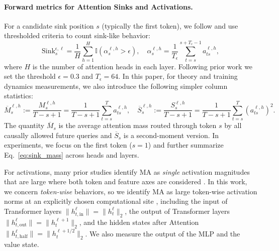 \documentclass{article}
\theoremstyle{plain}
\theoremstyle{definition}
\theoremstyle{remark}
\begin{document}
\paragraph{Forward metrics for Attention Sinks and Activations.}
For a candidate sink position $s$ (typically the first token), we follow \citep{gu2025when,queipo-de-llano2026attention} and use thresholded criteria to count sink-like behavior:
\begin{equation}\label{eq:sink_rate}
    \text{Sink}_s^{\epsilon,\ell} = \frac{1}{H} \sum_{h=1}^H \mathbb{I}(\alpha_s^{\ell,h} > \epsilon),
    \quad
    \alpha_s^{\ell,h}=\frac{1}{T_\epsilon}\sum_{t=s}^{s+T_\epsilon-1} a_{ts}^{\ell,h},
\end{equation}
where $H$ is the number of attention heads in each layer. Following prior work \citep{gu2025when} we set the threshold $\epsilon=0.3$ and $T_\epsilon=64$. In this paper, for theory and training dynamics measurements, we also introduce the following simpler column statistics:
\begin{equation}\label{eq:sink_mass}
\overline M_s^{\ell,h} := \frac{M_s^{\ell,h}}{T-s+1} = \frac{1}{T-s+1} \sum_{t=s}^{T} a_{ts}^{\ell,h},
\quad
\overline S_s^{\ell,h} := \frac{S_s^{\ell,h}}{T-s+1} = \frac{1}{T-s+1}\sum_{t=s}^{T} (a_{ts}^{\ell,h})^2.
\end{equation}
The quantity $\overline M_s$ is the average attention mass routed through token $s$ by all causally allowed future queries and $\overline S_s$ is a second-moment version. In experiments, we focus on the first token ($s=1$) and further summarize Eq.~\eqref{eq:sink_mass} across heads and layers.

For activations, many prior studies identify MA as \emph{single} activation magnitudes that are large where both token and feature axes are considered \citep{bondarenko2023quantizable,sun2024massive}. 
In this work, we concern \emph{token-wise} behaviors, so we identify MA as large token-wise activation norms at an explicitly chosen computational site \citep{guo2025activedormant}, including the input of Transformer layers $\|h_{t,\mathrm{in}}^\ell\|=\|h_t^\ell\|_2$, the output of Transformer layers $\|h_{t,\mathrm{out}}^\ell\|=\|h_t^{\ell+1}\|_2$, and the hidden states after Attention $\|h_{t,\mathrm{half}}^\ell\|=\|h_t^{\ell+{1}/{2}}\|_2$.
We also measure the output of the MLP and the value state.
\end{document}
